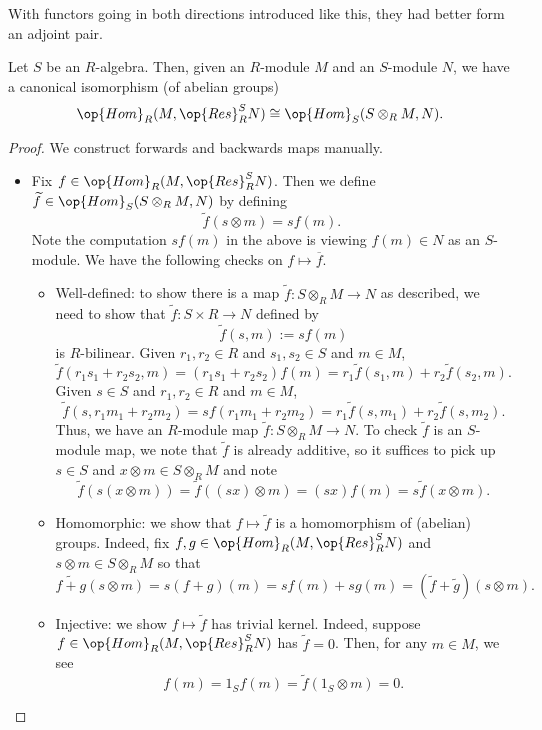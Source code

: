 With functors going in both directions introduced like this, they had better form an adjoint pair.
\begin{proposition} \label{prop:tenresadjoint}
	Let $S$ be an $R$-algebra. Then, given an $R$-module $M$ and an $S$-module $N$, we have a canonical isomorphism (of abelian groups)
	\[\op{Hom}_R(M,\op{Res}_R^SN)\cong\op{Hom}_S(S\otimes_RM,N).\]
\end{proposition}
\begin{proof}
	We construct forwards and backwards maps manually.
	\begin{itemize}
		\item Fix $f\in\op{Hom}_R(M,\op{Res}_R^SN)$. Then we define $\widetilde f\in\op{Hom}_S(S\otimes_RM,N)$ by defining
		\[\widetilde f(s\otimes m)=sf(m).\]
		Note the computation $sf(m)$ in the above is viewing $f(m)\in N$ as an $S$-module. We have the following checks on $f\mapsto\overline f$.
		\begin{itemize}
			\item Well-defined: to show there is a map $\widetilde f:S\otimes_RM\to N$ as described, we need to show that $\widetilde f:S\times R\to N$ defined by
			\[\widetilde f(s,m):=sf(m)\]
			is $R$-bilinear. Given $r_1,r_2\in R$ and $s_1,s_2\in S$ and $m\in M$,
			\[\widetilde f(r_1s_1+r_2s_2,m)=(r_1s_1+r_2s_2)f(m)=r_1\widetilde f(s_1,m)+r_2\widetilde f(s_2,m).\]
			Given $s\in S$ and $r_1,r_2\in R$ and $m\in M$,
			\[\widetilde f(s,r_1m_1+r_2m_2)=sf(r_1m_1+r_2m_2)=r_1\widetilde f(s,m_1)+r_2\widetilde f(s,m_2).\]
			Thus, we have an $R$-module map $\widetilde f:S\otimes_RM\to N$. To check $\widetilde f$ is an $S$-module map, we note that $\widetilde f$ is already additive, so it suffices to pick up $s\in S$ and $x\otimes m\in S\otimes_RM$ and note
			\[\widetilde f(s(x\otimes m))=\widetilde f((sx)\otimes m)=(sx)f(m)=s\widetilde f(x\otimes m).\]
			\item Homomorphic: we show that $f\mapsto\widetilde f$ is a homomorphism of (abelian) groups. Indeed, fix $f,g\in\op{Hom}_R(M,\op{Res}_R^SN)$ and $s\otimes m\in S\otimes_RM$ so that
			\[\widetilde{f+g}(s\otimes m)=s(f+g)(m)=sf(m)+sg(m)=(\widetilde f+\widetilde g)(s\otimes m).\]
			\item Injective: we show $f\mapsto\widetilde f$ has trivial kernel. Indeed, suppose $f\in\op{Hom}_R(M,\op{Res}_R^SN)$ has $\widetilde f=0$. Then, for any $m\in M$, we see
			\[f(m)=1_Sf(m)=\widetilde f(1_S\otimes m)=0.\]
		\end{itemize}


\end{itemize}
\end{proof}
